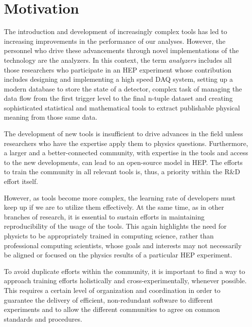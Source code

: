\documentclass[12pt,a4paper]{article}
\begin{document}
\section{Motivation}


The introduction and development of increasingly complex tools has led to
increasing improvements in the performance of our analyses. However, the
personnel who drive these advancements through novel implementations of the
technology are the analyzers. In this context, the term {\it analyzers} includes
all those researchers who participate in an HEP experiment whose contribution
includes designing and implementing a high speed DAQ system, setting up a modern
database to store the state of a detector, complex task of managing the data
flow from the first trigger level to the final n-tuple dataset and creating
sophisticated statistical and mathematical tools to extract publishable physical
meaning from those same data.

The development of new tools is insufficient to drive advances in the field
unless researchers who have the expertise apply them to physics questions.
Furthermore, a larger and a better-connected community, with expertise in the
tools and access to the new developments, can lead to an open-source model in
HEP. The efforts to train the community in all relevant tools is, thus, a
priority within the R\&D effort itself.

However, as tools become more complex, the learning rate of developers must keep
up if we are to utilize them effectively.  At the same time, as in other
branches of research, it is essential to sustain efforts in maintaining
reproducibility of the usage of the tools. This again highlights the need for
physicts to be appropriately trained in computing science, rather than
professional computing scientists, whose goals and interests may not necessarily
be aligned or focused on the physics results of a particular HEP experiment.

To avoid duplicate efforts within the community, it is important to find a way
to approach training efforts holistically and cross-experimentally, whenever
possible. This requires a certain level of organization and coordination in
order to guarantee the delivery of efficient, non-redundant software to
different experiments and to allow the different communities to agree on common
standards and procedures.
\end{document}
